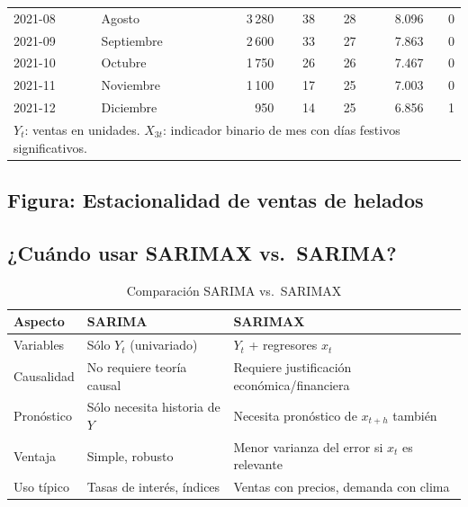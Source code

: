 \documentclass[12pt, a4paper]{article}
\begin{document}
\begin{table}[H]
\begin{tabular}{llrrrrr}
    2021-08 & Agosto     & 3\,280 & 38 & 28 & 8.096 & 0 \\
    2021-09 & Septiembre & 2\,600 & 33 & 27 & 7.863 & 0 \\
    2021-10 & Octubre    & 1\,750 & 26 & 26 & 7.467 & 0 \\
    2021-11 & Noviembre  & 1\,100 & 17 & 25 & 7.003 & 0 \\
    2021-12 & Diciembre  &   950 & 14 & 25 & 6.856 & 1 \\
    \bottomrule
    \multicolumn{7}{l}{\small $Y_t$: ventas en unidades. $X_{3t}$: indicador binario de mes con días festivos significativos.}
  \end{tabular}
\end{table}

\subsection{Figura: Estacionalidad de ventas de helados}


\subsection{¿Cuándo usar SARIMAX vs.\ SARIMA?}

\begin{table}[H]
  \centering
  \caption{Comparación SARIMA vs.\ SARIMAX}
  \label{tab:comparacion}
  \begin{tabular}{lp{5cm}p{5cm}}
    \toprule
    \textbf{Aspecto} & \textbf{SARIMA} & \textbf{SARIMAX} \\
    \midrule
    Variables   & Sólo $Y_t$ (univariado) & $Y_t$ + regresores $x_t$ \\
    Causalidad  & No requiere teoría causal & Requiere justificación económica/financiera \\
    Pronóstico  & Sólo necesita historia de $Y$ & Necesita pronóstico de $x_{t+h}$ también \\
    Ventaja     & Simple, robusto & Menor varianza del error si $x_t$ es relevante \\
    Uso típico  & Tasas de interés, índices & Ventas con precios, demanda con clima \\
    \bottomrule
  \end{tabular}
\end{table}
\end{document}
